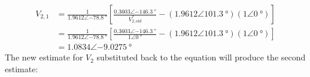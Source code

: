 \begin{enumerate}
	\begin{align}
		V_{2,1} &= \frac{1}{1.9612\angle\SI{-78.8}{\degree}}\left[\frac{0.3603\angle\SI{-146.3}{\degree}}{V^*_{2,old}}-\left(1.9612\angle\SI{101.3}{\degree}\right)\left(1\angle\SI{0}{\degree}\right)\right]\\
		&= \frac{1}{1.9612\angle\SI{-78.8}{\degree}}\left[\frac{0.3603\angle\SI{-146.3}{\degree}}{1\angle\SI{0}{\degree}}-\left(1.9612\angle\SI{101.3}{\degree}\right)\left(1\angle\SI{0}{\degree}\right)\right]\\
		&= 1.0834\angle\SI{-9.0275}{\degree}
	\end{align}
	The new estimate for $V_2$ substituted back to the equation will produce the second estimate:
\end{enumerate}